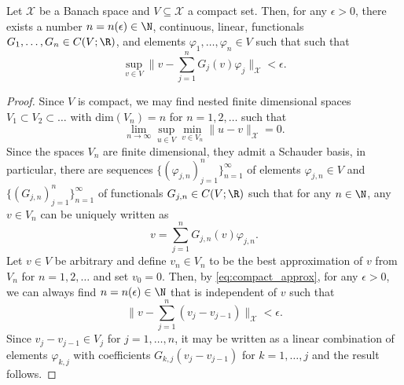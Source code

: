 {\begin{lemma}
\label{lemma:compact_representers}
Let \(\mathcal{X}\) be a Banach space and \(V \subseteq \mathcal{X}\) a compact set. Then, for any 
\(\epsilon > 0\), there exists a number \(n = n(\epsilon) \in \N\), continuous, linear, functionals \(G_1, \dots, G_n \in C(V;\R)\),
and elements \(\varphi_1,\dots,\varphi_n \in V\) such that
such that
\[\sup_{v \in V} \Big\|v - \sum_{j=1}^n G_j(v) \varphi_j \Big\|_{\mathcal{X}} < \epsilon.\]
\end{lemma}
\begin{proof}
Since \(V\) is compact,
we may find nested finite dimensional spaces \(V_1 \subset V_2 \subset \dots\) with \(\text{dim}(V_n) = n\)
for \(n=1,2,\dots\) such that
\begin{equation}
\label{eq:compact_approx}
\lim_{n \to \infty} \sup_{u \in V} \min_{v \in V_n} \|u - v\|_{\mathcal{X}} = 0.
\end{equation}
Since the spaces \(V_n\) are finite dimensional, they admit a Schauder basis, in particular,
there are sequences \(\{(\varphi_{j,n})_{j=1}^n\}_{n=1}^\infty\) of elements \(\varphi_{j,n} \in V\)
and \(\{(G_{j,n})_{j=1}^n\}_{n=1}^\infty\) of functionals \(G_{j,n} \in C(V;\R)\)
such that for any \(n \in \N\), any \(v \in V_n\) can be uniquely written as
\[v = \sum_{j=1}^n G_{j,n}(v) \varphi_{j,n}.\]
Let \(v \in V\) be arbitrary and define \(v_n \in V_n\) to be the best approximation of
\(v\) from \(V_n\) for \(n=1,2,\dots\) and set \(v_0 = 0\). Then, by \eqref{eq:compact_approx}, 
for any \(\epsilon > 0\), we can always find \(n = n(\epsilon) \in \N\) that is independent of \(v\) such that
\[\Big\|v - \sum_{j=1}^n (v_j - v_{j-1}) \Big\|_{\mathcal{X}} < \epsilon.\]
Since \(v_j - v_{j-1} \in V_j\) for \(j=1,\dots,n\), it may be written as a linear combination of 
elements \(\varphi_{k,j}\) with coefficients \(G_{k,j}(v_j - v_{j-1})\) for \(k=1,\dots,j\)
and the result follows.
\end{proof}

}
